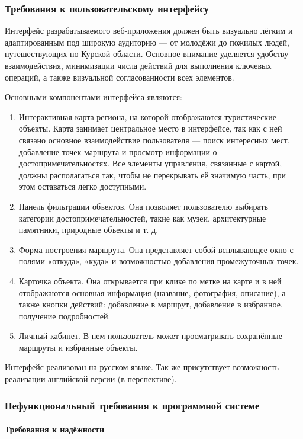 \subsubsection{Требования к пользовательскому интерфейсу}

Интерфейс разрабатываемого веб-приложения должен быть визуально лёгким и адаптированным под широкую аудиторию\cite{b8} — от молодёжи до пожилых людей, путешествующих по Курской области. Основное внимание уделяется удобству взаимодействия, минимизации числа действий для выполнения ключевых операций, а также визуальной согласованности всех элементов.

Основными компонентами\cite{b9} интерфейса являются:
\begin{enumerate}
	\item Интерактивная карта региона, на которой отображаются туристические объекты. Карта  занимает центральное место в интерфейсе, так как с ней связано основное взаимодействие пользователя — поиск интересных мест, добавление точек маршрута и просмотр информации о достопримечательностях. Все элементы управления, связанные с картой, должны располагаться так, чтобы не перекрывать её значимую часть, при этом оставаться легко доступными.
	\item Панель фильтрации объектов. Она позволяет пользователю выбирать категории достопримечательностей, такие как музеи, архитектурные памятники, природные объекты и т. д.
	\item Форма построения маршрута. Она представляет собой всплывающее окно с полями «откуда», «куда» и возможностью добавления промежуточных точек.
	\item Карточка объекта. Она открывается при клике по метке на карте и в ней отображаются основная информация (название, фотография, описание), а также кнопки действий: добавление в маршрут, добавление в избранное, получение подробностей.
	\item Личный кабинет. В нем пользователь может просматривать сохранённые маршруты и избранные объекты.
\end{enumerate}

Интерфейс реализован на русском языке. Так же присутствует возможность реализации английской версии (в перспективе).

\subsubsection{Нефункциональный требования к программной системе}
\paragraph{Требования к надёжности}

